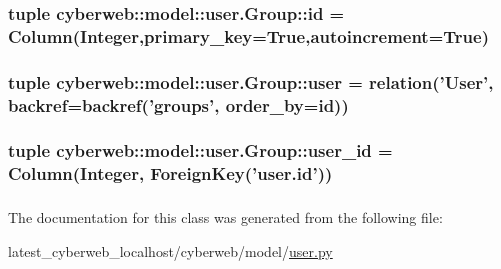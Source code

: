\hypertarget{classcyberweb_1_1model_1_1user_1_1_group_ad236993ccf316da8f760735f5f418c85}{
\subsubsection[{id}]{\setlength{\rightskip}{0pt plus 5cm}tuple {\bf cyberweb\-::model\-::user.\-Group\-::id} = \-Column(\-Integer,primary\-\_\-key=\-True,autoincrement=\-True)}}\label{classcyberweb_1_1model_1_1user_1_1_group_ad236993ccf316da8f760735f5f418c85}
\hypertarget{classcyberweb_1_1model_1_1user_1_1_group_ab45c2c9f4291eeb4dfeff978c640c75c}{
\subsubsection[{user}]{\setlength{\rightskip}{0pt plus 5cm}tuple {\bf cyberweb\-::model\-::user.\-Group\-::user} = relation('{\bf \-User}', backref=backref('groups', order\-\_\-by={\bf id}))}}\label{classcyberweb_1_1model_1_1user_1_1_group_ab45c2c9f4291eeb4dfeff978c640c75c}
\hypertarget{classcyberweb_1_1model_1_1user_1_1_group_ae367d58cb0b0418e265cd122a2706b4f}{
\subsubsection[{user\-\_\-id}]{\setlength{\rightskip}{0pt plus 5cm}tuple {\bf cyberweb\-::model\-::user.\-Group\-::user\-\_\-id} = \-Column(\-Integer, \-Foreign\-Key('user.\-id'))}}\label{classcyberweb_1_1model_1_1user_1_1_group_ae367d58cb0b0418e265cd122a2706b4f}
\hypertarget{classcyberweb_1_1model_1_1user_1_1_group_aacb186c6ff7d713002e50f2ebcb9dd93}{
\subsubsection[{user\-\_\-id}]{}}\label{classcyberweb_1_1model_1_1user_1_1_group_aacb186c6ff7d713002e50f2ebcb9dd93}


\-The documentation for this class was generated from the following file\-:\begin{DoxyCompactItemize}
\item 
latest\-\_\-cyberweb\-\_\-localhost/cyberweb/model/\hyperlink{model_2user_8py}{user.\-py}\end{DoxyCompactItemize}
